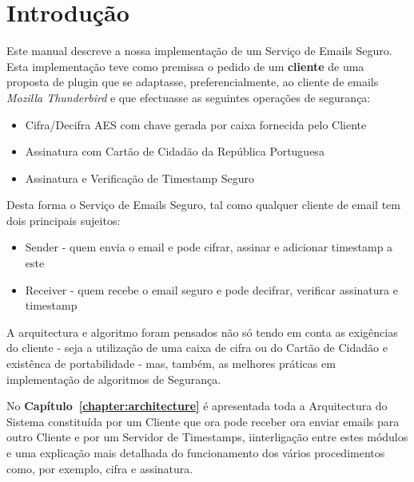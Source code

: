 \chapter{Introdução}
\label{chapter:introduction}


Este manual descreve a nossa implementação de um Serviço de Emails Seguro. Esta implementação teve como premissa o pedido de um \textbf{cliente} de uma proposta de plugin que se adaptasse, preferencialmente, ao cliente de emails \textit{Mozilla Thunderbird} e que efectuasse as seguintes operações de segurança:
\begin{itemize}
\item Cifra/Decifra AES com chave gerada por caixa fornecida pelo Cliente
\item Assinatura com Cartão de Cidadão da República Portuguesa
\item Assinatura e Verificação de Timestamp Seguro
\end{itemize}

Desta forma o Serviço de Emails Seguro, tal como qualquer cliente de email tem dois principais sujeitos:
\begin{itemize}
\item Sender - quem envia o email e pode cifrar, assinar e adicionar timestamp a este
\item Receiver - quem recebe o email seguro e pode decifrar, verificar assinatura e timestamp
\end{itemize}

A arquitectura e algoritmo foram pensados não só tendo em conta as exigências do cliente - seja a utilização de uma caixa de cifra ou do Cartão de Cidadão e existênca de portabilidade - mas, também, as melhores práticas em implementação de algoritmos de Segurança.

No \textbf{Capítulo~\ref{chapter:architecture}} é apresentada toda a Arquitectura do Sistema constituída por um Cliente que ora pode receber ora enviar emails para outro Cliente e por um Servidor de Timestamps, iinterligação entre estes módulos e uma explicação mais detalhada do funcionamento dos vários procedimentos como, por exemplo, cifra e assinatura.

